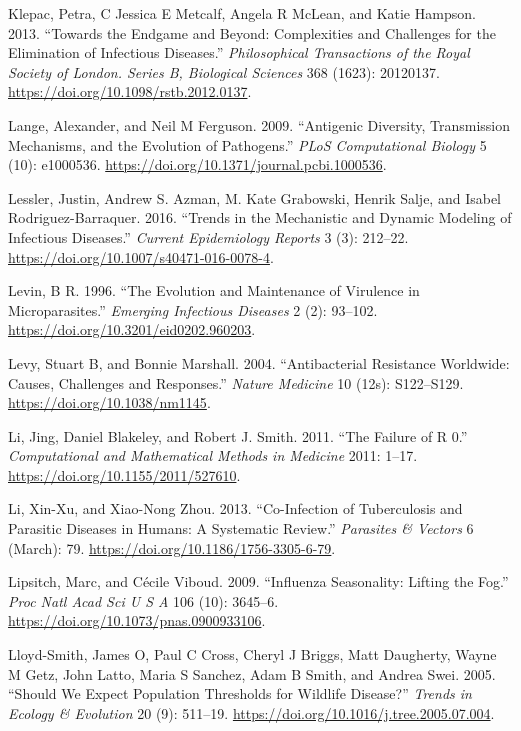 \documentclass[
]{book}
\begin{document}
\leavevmode\hypertarget{ref-klepac13}{}%
Klepac, Petra, C Jessica E Metcalf, Angela R McLean, and Katie Hampson. 2013. ``Towards the Endgame and Beyond: Complexities and Challenges for the Elimination of Infectious Diseases.'' \emph{Philosophical Transactions of the Royal Society of London. Series B, Biological Sciences} 368 (1623): 20120137. \url{https://doi.org/10.1098/rstb.2012.0137}.

\leavevmode\hypertarget{ref-lange09}{}%
Lange, Alexander, and Neil M Ferguson. 2009. ``Antigenic Diversity, Transmission Mechanisms, and the Evolution of Pathogens.'' \emph{PLoS Computational Biology} 5 (10): e1000536. \url{https://doi.org/10.1371/journal.pcbi.1000536}.

\leavevmode\hypertarget{ref-lessler16}{}%
Lessler, Justin, Andrew S. Azman, M. Kate Grabowski, Henrik Salje, and Isabel Rodriguez-Barraquer. 2016. ``Trends in the Mechanistic and Dynamic Modeling of Infectious Diseases.'' \emph{Current Epidemiology Reports} 3 (3): 212--22. \url{https://doi.org/10.1007/s40471-016-0078-4}.

\leavevmode\hypertarget{ref-levin96}{}%
Levin, B R. 1996. ``The Evolution and Maintenance of Virulence in Microparasites.'' \emph{Emerging Infectious Diseases} 2 (2): 93--102. \url{https://doi.org/10.3201/eid0202.960203}.

\leavevmode\hypertarget{ref-levy04}{}%
Levy, Stuart B, and Bonnie Marshall. 2004. ``Antibacterial Resistance Worldwide: Causes, Challenges and Responses.'' \emph{Nature Medicine} 10 (12s): S122--S129. \url{https://doi.org/10.1038/nm1145}.

\leavevmode\hypertarget{ref-li11}{}%
Li, Jing, Daniel Blakeley, and Robert J. Smith. 2011. ``The Failure of R 0.'' \emph{Computational and Mathematical Methods in Medicine} 2011: 1--17. \url{https://doi.org/10.1155/2011/527610}.

\leavevmode\hypertarget{ref-li13}{}%
Li, Xin-Xu, and Xiao-Nong Zhou. 2013. ``Co-Infection of Tuberculosis and Parasitic Diseases in Humans: A Systematic Review.'' \emph{Parasites \& Vectors} 6 (March): 79. \url{https://doi.org/10.1186/1756-3305-6-79}.

\leavevmode\hypertarget{ref-lipsitch09}{}%
Lipsitch, Marc, and Cécile Viboud. 2009. ``Influenza Seasonality: Lifting the Fog.'' \emph{Proc Natl Acad Sci U S A} 106 (10): 3645--6. \url{https://doi.org/10.1073/pnas.0900933106}.

\leavevmode\hypertarget{ref-lloyd-smith05b}{}%
Lloyd-Smith, James O, Paul C Cross, Cheryl J Briggs, Matt Daugherty, Wayne M Getz, John Latto, Maria S Sanchez, Adam B Smith, and Andrea Swei. 2005. ``Should We Expect Population Thresholds for Wildlife Disease?'' \emph{Trends in Ecology \& Evolution} 20 (9): 511--19. \url{https://doi.org/10.1016/j.tree.2005.07.004}.
\end{document}
